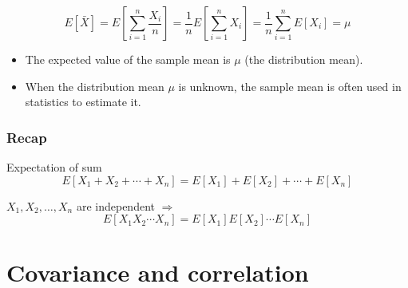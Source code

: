 \documentclass[slidestop,compress,mathserif]{beamer}
\begin{document}
\begin{frame}
\pause

$$E[\bar{X}] = E[\sum_{i=1}^n\frac{X_i}{n}] =
\frac{1}{n}E[\sum_{i=1}^nX_i]=
\frac{1}{n}\sum_{i=1}^nE[X_i]=
\mu$$
\pause
\begin{itemize}
\item The expected value of the sample mean is $\mu$ (the distribution mean).
\item When the distribution mean $\mu$ is unknown, the sample mean is often used in statistics to estimate it.
\end{itemize}
\end{frame}

\begin{frame}\frametitle{Recap}

Expectation of sum
\[E[X_1 + X_2 + \cdots + X_n] = E[X_1] + E[X_2] + \cdots + E[X_n]\]


$X_1, X_2, \ldots, X_n$ are independent $\Longrightarrow$ \red{$\not\Longleftarrow$}
\[E[X_1  X_2  \cdots  X_n] = E[X_1]  E[X_2]  \cdots  E[X_n]\]

\end{frame}







\section{Covariance and correlation}
\end{document}
